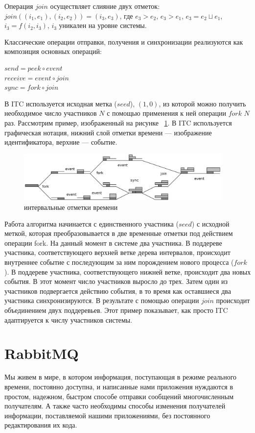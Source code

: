 Операция $join$ осуществляет слияние двух отметок: $join((i_1,e_1),(i_2,e_2)) = (i_3,e_3)$, где
$e_3 > e_2$, $e_3 > e_1$, $e_3 = e_2 \sqcup e_1$, $i_3 = f(i_2,i_3)$, $i_3$ уникален на уровне системы.

Классические операции отправки, получения и синхронизации реализуются как композиция основных операций:
\begin{center}
$send = peek \circ event$\\
$receive = event \circ join$\\
$sync = fork \circ join$
\end{center}
В ITC используется исходная метка ($seed$), $(1,0)$, из которой можно получить необходимое число участников $N$ с помощью применения к ней операции $fork$ $N$ раз.
Рассмотрим пример, изображенный на рисунке ~\ref{fig:tree}. В ITC используется графическая нотация, нижний слой отметки времени --- изображение идентификатора, верхние --- событие. 
\begin{figure}
\centering
\includegraphics[width=0.95\textwidth]{img/tree.png}
\caption{интервальные отметки времени}
\label{fig:tree}
\end{figure}
Работа алгоритма начинается с единственного участника ($seed$) с исходной меткой, которая преобразовывается в две временные отметки под действием операции fork. На данный момент в системе два участника. В поддереве участника, соответствующего верхней ветке дерева интервалов, происходит внутреннее событие с последующим за ним порождением нового процесса ($fork$). В поддереве участника, соответствующего нижней ветке, происходит два новых события. В этот момент число участников выросло до трех. Затем один из участников подвергается действию события, в то время как оставшиеся два участника синхронизируются. В результате с помощью операции $join$ происходит объединением двух поддеревьев. Этот пример показывает, как просто ITC адаптируется к числу участников системы.

\chapter{RabbitMQ} 
\label{sec:examples}
Мы живем в мире, в котором информация, поступающая в режиме реального времени, постоянно доступна, и написанные нами приложения нуждаются в простом, надежном, быстром способе отправки сообщений многочисленным получателям. А также часто необходимы способы изменения получателей информации, поставляемой нашими приложениями, без постоянного редактирования их кода.


